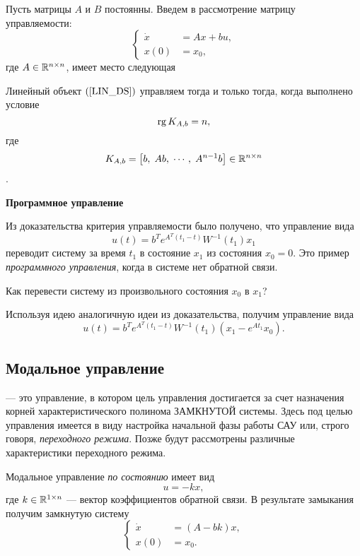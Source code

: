 \documentclass[../../TAU.tex]{subfiles}
\begin{document}
    Пусть матрицы $A$ и $B$ постоянны. Введем в рассмотрение матрицу управляемости:
    \begin{equation}\label{LIN_DS}
        \left\{
        \begin{aligned}
            \dot x &= Ax + bu,\\
            x(0) &= x_0,
        \end{aligned}
        \right.
    \end{equation}
    где $A\in\mathbb{R}^{n\times n}$, имеет место следующая
    \begin{theor}
        Линейный объект $\eref{LIN_DS}$ управляем тогда и только тогда, когда выполнено условие 
        $$
            \mathop{\mathrm{rg}}\nolimits K_{A,b} = n,
        $$
        где
        $$
            K_{A,b} = \left[b,\; Ab,\; \cdots,\; A^{n-1}b\right]\in\mathbb{R}^{n\times n}
        $$.
    \end{theor}

    \proof \cite[стр. 305]{voron2}
    \par
    \textbf{Программное управление}
    \par
    Из доказательства критерия управляемости было получено, что управление вида
    $$
        u(t) = b^Te^{A^T(t_1-t)}W^{-1}(t_1)x_1
    $$
    переводит систему за время $t_1$ в состояние $x_1$ из состояния $x_0 = 0$. Это пример {\it программного управления}, когда в системе нет обратной связи.

    Как перевести систему из произвольного состояния $x_0$ в $x_1$?

    Используя идею аналогичную идеи из доказательства, получим управление вида
    $$
        u(t) = b^Te^{A^T(t_1-t)}W^{-1}(t_1)(x_1 - e^{At_1}x_0).
    $$

\subsection{Модальное управление}

     --- это управление, в котором цель управления достигается за счет назначения корней характеристического полинома ЗАМКНУТОЙ системы. Здесь под целью управления имеется в виду настройка начальной фазы работы САУ или, строго говоря, {\it переходного режима}. Позже будут рассмотрены различные характеристики переходного режима.

    Модальное управление {\it по состоянию} имеет вид
    $$
        u = -kx,
    $$
    где $k\in\mathbb{R}^{1\times n}$ --- вектор коэффициентов обратной связи. В результате замыкания получим замкнутую систему
    $$
        \left\{
        \begin{aligned}
            \dot x &= (A - bk)x,\\
            x(0) &= x_0.
        \end{aligned}
        \right.
    $$
\end{document}
